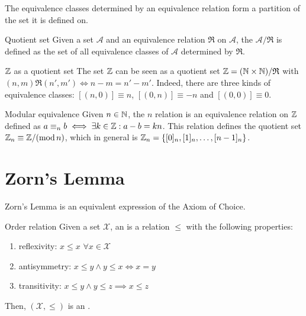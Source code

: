 The equivalence classes determined by an equivalence relation form a partition of the set it is defined on.

\begin{definition}{Quotient set}{}
  Given a set $ \mathcal{A} $ and an equivalence relation $ \mathfrak{R} $ on $ \mathcal{A} $, the  $ \mathcal{A} / \mathfrak{R} $ is defined as the set of all equivalence classes of $ \mathcal{A} $ determined by $ \mathfrak{R} $.
\end{definition}

\begin{example}{$ \mathbb{Z} $ as a quotient set}{}
  The set $ \mathbb{Z} $ can be seen as a quotient set $ \mathbb{Z} = (\mathbb{N} \times \mathbb{N}) / \mathfrak{R} $ with $ (n,m) \mathfrak{R} (n',m') \iff n - m = n' - m' $. Indeed, there are three kinds of equivalence classes: $ [(n,0)] \equiv n $, $ [(0,n)] \equiv -n $ and $ [(0,0)] \equiv 0 $.
\end{example}

\begin{example}{Modular equivalence}{}
  Given $ n \in \mathbb{N} $, the  $ n $ relation is an equivalence relation on $ \mathbb{Z} $ defined as $ a \equiv_n b \iff \exists k \in \mathbb{Z} : a - b = k n $. This relation defines the quotient set $ \mathbb{Z}_n \equiv \mathbb{Z} / (\mathrm{mod}\, n) $, which in general is $ \mathbb{Z}_n = \{[0]_n, [1]_n, \dots, [n-1]_n\} $.
\end{example}

\section{Zorn's Lemma}

Zorn's Lemma is an equivalent expression of the Axiom of Choice.

\begin{definition}{Order relation}{}
  Given a set $ \mathcal{X} $, an  is a relation $ \leq $ with the following properties:
  \begin{enumerate}
    \item reflexivity: $ x \leq x \,\,\forall x \in \mathcal{X} $
    \item antisymmetry: $ x \leq y \land y \leq x \iff x = y $
    \item transitivity: $ x \leq y \land y \leq z \implies x \leq z $
  \end{enumerate}
  Then, $ (\mathcal{X} , \leq) $ is an .
\end{definition}

